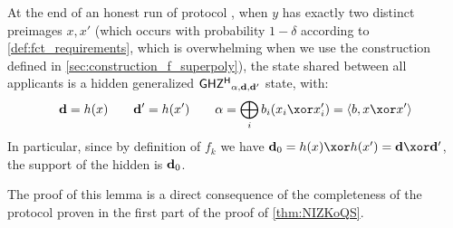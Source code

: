 
\begin{lemmaE}\label{lem:correctnessBlind}
  At the end of an honest run of protocol \blind{}, when $y$ has exactly two distinct preimages $x,x'$ (which occurs with probability $1-\delta$ according to \cref{def:fct_requirements}, which is overwhelming when we use the construction defined in \cref{sec:construction_f_superpoly}), the state shared between all applicants is a hidden generalized $ {\sf GHZ^H} _{\alpha,\mathbf{d},\mathbf{d}'}$ state, with:
  \begin{align}
    \vect{d} = h(x) \qquad \vect{d}'= h(x') \qquad \alpha = \bigoplus_i b_i (x_i \xor x'_i) = \langle b, x \xor x'\rangle
  \end{align}
  In particular, since by definition of $f_k$ we have $\vect{d}_0 = h(x) \xor h(x') = \vect{d} \xor \vect{d}'$, the support of the hidden \GHZ{} is $\mathbf{d}_0$.
\end{lemmaE}
The proof of this lemma is a direct consequence of the completeness of the protocol \blindZK{} proven in the first part of the proof of \cref{thm:NIZKoQS}.

